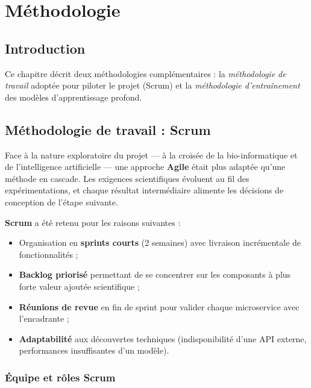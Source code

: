 \documentclass[12pt,a4paper,oneside]{book}
\begin{document}
\chapter{Méthodologie}
\label{ch:methodo}

\section*{Introduction}
Ce chapitre décrit deux méthodologies complémentaires : la \emph{méthodologie
de travail} adoptée pour piloter le projet (Scrum) et la \emph{méthodologie
d'entraînement} des modèles d'apprentissage profond.

\section{Méthodologie de travail : Scrum}

Face à la nature exploratoire du projet --- à la croisée de la
bio-informatique et de l'intelligence artificielle --- une approche
\textbf{Agile} était plus adaptée qu'une méthode en cascade. Les exigences
scientifiques évoluent au fil des expérimentations, et chaque résultat
intermédiaire alimente les décisions de conception de l'étape suivante.

\textbf{Scrum} a été retenu pour les raisons suivantes :
\begin{itemize}
  \item Organisation en \textbf{sprints courts} (2 semaines) avec livraison
    incrémentale de fonctionnalités ;
  \item \textbf{Backlog priorisé} permettant de se concentrer sur les
    composants à plus forte valeur ajoutée scientifique ;
  \item \textbf{Réunions de revue} en fin de sprint pour valider chaque
    microservice avec l'encadrante ;
  \item \textbf{Adaptabilité} aux découvertes techniques (indisponibilité
    d'une API externe, performances insuffisantes d'un modèle).
\end{itemize}

\subsection{Équipe et rôles Scrum}
\end{document}
